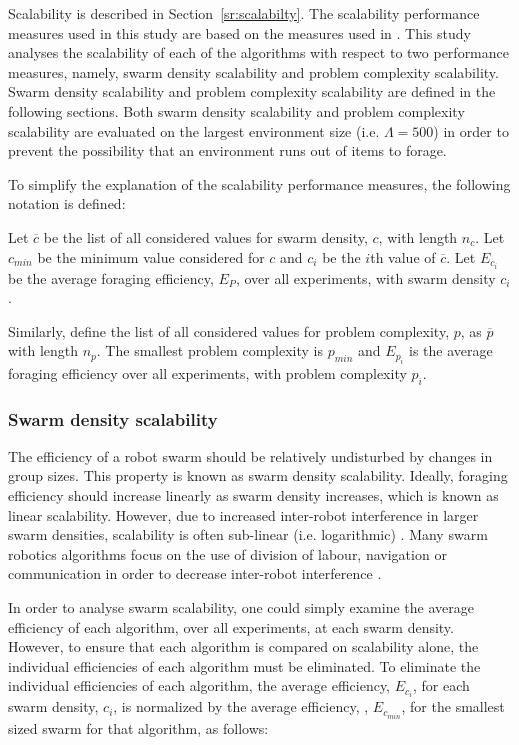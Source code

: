 \documentclass[preprint,12pt]{elsarticle}
\begin{document}
Scalability is described in Section~\ref{sr:scalabilty}. The scalability performance measures used in this study are based on the measures used in \cite{hecker2015beyond}. This study analyses the scalability of each of the algorithms with respect to two performance measures, namely, swarm density scalability and problem complexity scalability. Swarm density scalability and problem complexity scalability are defined in the following sections. Both swarm density scalability and problem complexity scalability are evaluated on the largest environment size (i.e. $\Lambda=500$) in order to prevent the possibility that an environment runs out of items to forage.

To simplify the explanation of the scalability performance measures, the following notation is defined:

Let $\overline{c}$ be the list of all considered values for swarm density, $c$, with length $n_c$. Let $c_{min}$ be the minimum value considered for $c$ and $c_i$ be the $i$th value of $\overline{c}$. Let $E_{c_i}$ be the average foraging efficiency, $E_P$, over all experiments, with swarm density $c_i$.

Similarly, define the list of all considered values for problem complexity, $p$, as $\overline{p}$ with length $n_p$. The smallest problem complexity is $p_{min}$ and $E_{p_i}$ is the average foraging efficiency over all experiments, with problem complexity $p_i$.


\subsubsection{Swarm density scalability}
\label{swarmsizescalability}

The efficiency of a robot swarm should be relatively undisturbed by changes in group sizes. This property is known as swarm density scalability. Ideally, foraging efficiency should increase linearly as swarm density increases, which is known as linear scalability. However, due to increased inter-robot interference in larger swarm densities, scalability is often sub-linear (i.e. logarithmic) \cite{lerman2002mathematical}. Many swarm robotics algorithms focus on the use of division of labour, navigation or communication in order to decrease inter-robot interference \cite{lerman2002mathematical, schneider1998territorial}.

In order to analyse swarm scalability, one could simply examine the average efficiency of each algorithm, over all experiments, at each swarm density. However, to ensure that each algorithm is compared on scalability alone, the individual efficiencies of each algorithm must be eliminated. To eliminate the individual efficiencies of each algorithm, the average efficiency, $E_{c_i}$, for each swarm density, $c_i$, is normalized by the average efficiency, , $E_{c_{min}}$, for the smallest sized swarm for that algorithm, as follows: 
\end{document}
